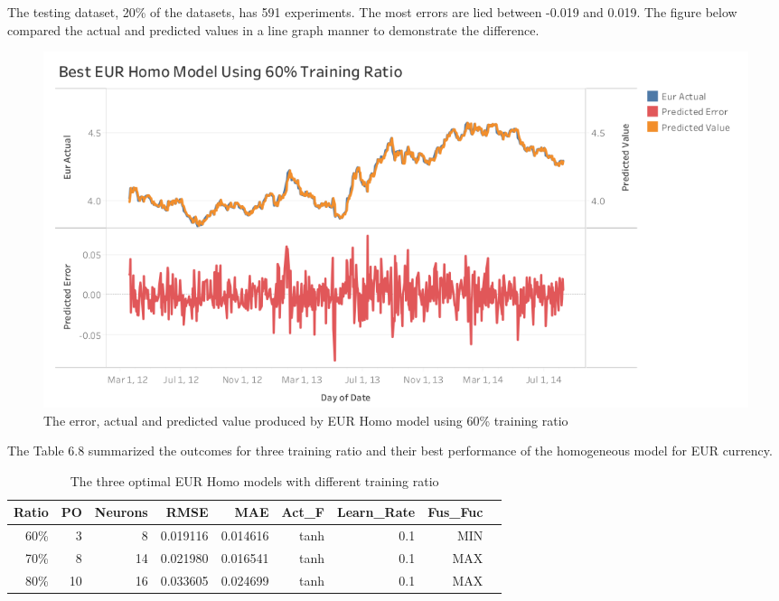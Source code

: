 {{{{{{{{{{{			
The testing dataset, 20\% of the datasets, has 591 experiments. The most errors are lied between -0.019 and 0.019. The figure below compared the actual and predicted values in a line graph manner to demonstrate the difference.\\
			
	\begin{figure}[hbt!]\centering
		\includegraphics[width=1\textwidth]{best_eur_homo_APV_60}
		\caption{The error, actual and predicted value produced by EUR Homo model using 60\% training ratio}
	\end{figure}
	\pagebreak


The Table 6.8 summarized the outcomes for three training ratio and their best performance of the homogeneous model for EUR currency.

\setlength{\tabcolsep}{0.5em} %
{\renewcommand{\arraystretch}{1.2}
	
	\begin{table}[ht]
		\centering
		\begin{tabular}{@{}rrrrrrrrr@{}}
			\toprule
			\textbf{Ratio}&\textbf{PO}&\textbf{Neurons}& \textbf{RMSE} & \textbf{MAE} & \textbf{Act\_F} & \textbf{Learn\_Rate} &\textbf{ Fus\_Fuc}\\ 
			\midrule
			60\% & 3 & 8 & 0.019116 & 0.014616 & tanh & 0.1 & MIN \\ 
			70\% &  8 & 14 & 0.021980 & 0.016541 & tanh & 0.1 & MAX \\	
			80\% & 10 & 16 & 0.033605 & 0.024699 & tanh & 0.1 & MAX \\ 
			\hline
		\end{tabular}
		\hspace*{1cm}
		\caption{The three optimal EUR Homo models with different training ratio}
		
	\end{table}

}}}}}}}}}}}}
